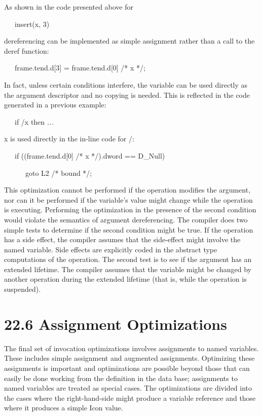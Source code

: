 As shown in the code presented above for 

{\ttfamily\mdseries
\ \ \ insert(x, 3)}

\noindent
dereferencing can be implemented as simple assignment rather than a
call to the deref function:

{\ttfamily\mdseries
\ \ \ frame.tend.d[3] = frame.tend.d[0] /* x */;}


In fact, unless certain conditions interfere, the variable can be used
directly as the argument descriptor and no copying is needed. This is
reflected in the code generated in a previous example:

{\ttfamily\mdseries
\ \ \ if /x then \textit{...}}


x is used directly in the in-line code for /: 

{\ttfamily\mdseries
\ \ \ if ((frame.tend.d[0] /* x */).dword == D\_Null)}

{\ttfamily\mdseries
\ \ \ \ \ \ goto L2 /* bound */;}


This optimization cannot be performed if the operation modifies the
argument, nor can it be performed if the variable's value might change
while the operation is executing. Performing the optimization in the
presence of the second condition would violate the semantics of
argument dereferencing. The compiler does two simple tests to
determine if the second condition might be true. If the operation has
a side effect, the compiler assumes that the side-effect might involve
the named variable. Side effects are explicitly coded in the abstract
type computations of the operation. The second test is to see if the
argument has an extended lifetime. The compiler assumes that the
variable might be changed by another operation during the extended
lifetime (that is, while the operation is suspended).


\section[22.6 Assignment Optimizations]{22.6 Assignment Optimizations}

The final set of invocation optimizations involves assignments to
named variables. These includes simple assignment and augmented
assignments. Optimizing these assignments is important and
optimizations are possible beyond those that can easily be done
working from the definition in the data base; assignments to named
variables are treated as special cases. The optimizations are divided
into the cases where the right-hand-side might produce a variable
reference and those where it produces a simple Icon value.


